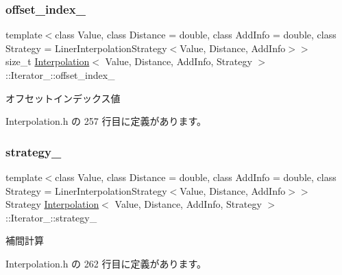 \subsubsection{\texorpdfstring{offset\+\_\+index\+\_\+}{offset\_index\_}}
{\footnotesize\ttfamily template$<$class Value, class Distance = double, class Add\+Info = double, class Strategy = Liner\+Interpolation\+Strategy$<$\+Value, Distance, Add\+Info$>$$>$ \\
size\+\_\+t \mbox{\hyperlink{class_interpolation}{Interpolation}}$<$ Value, Distance, Add\+Info, Strategy $>$\+::Iterator\+\_\+\+::offset\+\_\+index\+\_\+\hspace{0.3cm}{\ttfamily [private]}}



オフセットインデックス値 



 Interpolation.\+h の 257 行目に定義があります。

\mbox{\label{class_interpolation_1_1_iterator___ac18d51aa7e4870305637f2ef4c0d93e1}} 
\subsubsection{\texorpdfstring{strategy\+\_\+}{strategy\_}}
{\footnotesize\ttfamily template$<$class Value, class Distance = double, class Add\+Info = double, class Strategy = Liner\+Interpolation\+Strategy$<$\+Value, Distance, Add\+Info$>$$>$ \\
Strategy \mbox{\hyperlink{class_interpolation}{Interpolation}}$<$ Value, Distance, Add\+Info, Strategy $>$\+::Iterator\+\_\+\+::strategy\+\_\+\hspace{0.3cm}{\ttfamily [private]}}



補間計算 



 Interpolation.\+h の 262 行目に定義があります。

\mbox{\label{class_interpolation_1_1_iterator___a580ce898a3f5a82003a19ddd781ad485}} 

